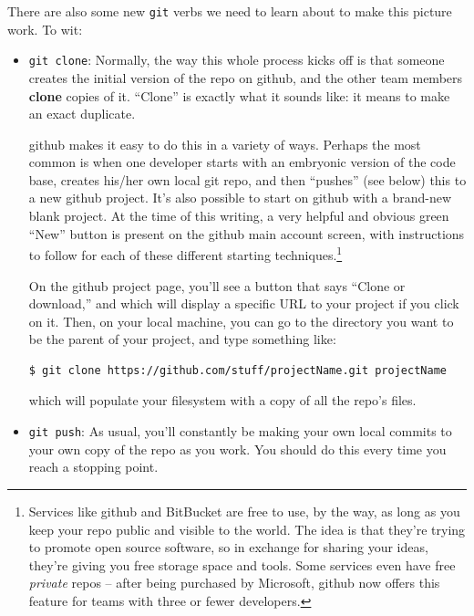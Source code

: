 There are also some new \texttt{git} verbs we need to learn about to make this
picture work. To wit:

\begin{itemize}
\item \texttt{git clone}: Normally, the way this whole process kicks off is
that someone creates the initial version of the repo on github, and the other
team members \textbf{clone} copies of it. ``Clone'' is exactly what it sounds
like: it means to make an exact duplicate.

github makes it easy to do this in a variety of ways. Perhaps the most common
is when one developer starts with an embryonic version of the code base,
creates his/her own local git repo, and then ``pushes'' (see below) this to a
new github project. It's also possible to start on github with a brand-new
blank project. At the time of this writing, a very helpful and obvious green
``New'' button is present on the github main account screen, with instructions
to follow for each of these different starting techniques.\footnote{Services
like github and BitBucket are free to use, by the way, as long as you keep your
repo public and visible to the world. The idea is that they're trying to
promote open source software, so in exchange for sharing your ideas, they're
giving you free storage space and tools. Some services even have free
\textit{private} repos -- after being purchased by Microsoft, github now offers
this feature for teams with three or fewer developers.}

On the github project page, you'll see a button that says ``Clone or
download,'' and which will display a specific URL to your project if you click
on it. Then, on your local machine, you can go to the directory you want to be
the parent of your project, and type something like:

\begin{Verbatim}[fontsize=\scriptsize,samepage=true,frame=none]
$ git clone https://github.com/stuff/projectName.git projectName
\end{Verbatim}

which will populate your filesystem with a copy of all the repo's files.

\item \texttt{git push}: As usual, you'll constantly be making your own local
commits to your own copy of the repo as you work. You should do this every
time you reach a stopping point.


\end{itemize}
